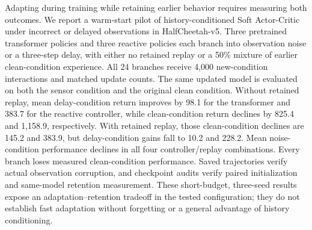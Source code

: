Adapting during training while retaining earlier behavior requires measuring both outcomes. We report a warm-start pilot of history-conditioned Soft Actor-Critic under incorrect or delayed observations in HalfCheetah-v5. Three pretrained transformer policies and three reactive policies each branch into observation noise or a three-step delay, with either no retained replay or a 50\% mixture of earlier clean-condition experience. All 24 branches receive 4,000 new-condition interactions and matched update counts. The same updated model is evaluated on both the sensor condition and the original clean condition. Without retained replay, mean delay-condition return improves by 98.1 for the transformer and 383.7 for the reactive controller, while clean-condition return declines by 825.4 and 1,158.9, respectively. With retained replay, those clean-condition declines are 145.2 and 383.9, but delay-condition gains fall to 10.2 and 228.2. Mean noise-condition performance declines in all four controller/replay combinations. Every branch loses measured clean-condition performance. Saved trajectories verify actual observation corruption, and checkpoint audits verify paired initialization and same-model retention measurement. These short-budget, three-seed results expose an adaptation--retention tradeoff in the tested configuration; they do not establish fast adaptation without forgetting or a general advantage of history conditioning.
